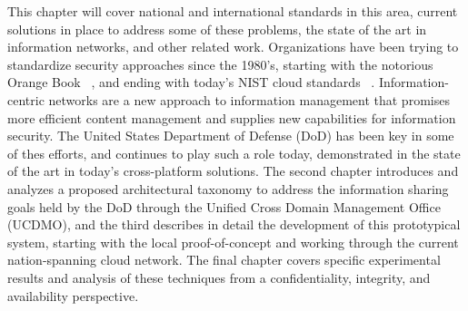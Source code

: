 This chapter will cover national and international standards in this area, current solutions in place to address some of these problems, the state of the art in information networks, and other related work.  Organizations have been trying to standardize security approaches since the 1980's, starting with the notorious Orange Book ~\cite{OrangeBook}, and ending with today's NIST cloud standards ~\cite{NIST800:144}.  Information-centric networks are a new approach to information management that promises more efficient content  management and supplies new capabilities for information security. The United States Department of Defense (DoD) has been key in some of thes efforts, and continues to play such a role today, demonstrated in the state of the art in today's cross-platform solutions.  The second chapter introduces and analyzes a proposed architectural taxonomy to address the information sharing goals held by the DoD through the Unified Cross Domain Management Office (UCDMO), and the third describes in detail the development of this prototypical system, starting with the local proof-of-concept and working through the current nation-spanning cloud network.  The final chapter covers specific experimental results and analysis of these techniques from a confidentiality, integrity, and availability perspective.
